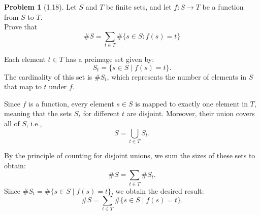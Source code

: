 \documentclass[12pt]{article}
\theoremstyle{definition}
\newtheorem{problem}{Problem}
\begin{document}
\begin{problem}[1.18]

    Let $S$ and $T$ be finite sets, and let $f: S \rightarrow T$ be a function from $S$ to $T$.\\
    Prove that
    \[
    \#S = \sum_{t \in T}\#\{s \in S : f(s) = t\}
    \]

    \begin{solution}
        Each element \( t \in T \) has a preimage set given by:
        \[
        S_t = \{ s \in S \mid f(s) = t \}.
        \]
        The cardinality of this set is \( \#S_t \), which represents the number of elements in \( S \) that map to \( t \) under \( f \).

        Since \( f \) is a function, every element \( s \in S \) is mapped to exactly one element in \( T \), meaning that the sets \( S_t \) for different \( t \) are disjoint. Moreover, their union covers all of \( S \), i.e.,
        \[
        S = \bigcup_{t \in T} S_t.
        \]

        By the principle of counting for disjoint unions, we sum the sizes of these sets to obtain:
        \[
        \#S = \sum_{t \in T} \#S_t.
        \]
        Since \( \#S_t = \#\{ s \in S \mid f(s) = t \} \), we obtain the desired result:
        \[
        \#S = \sum_{t \in T} \#\{ s \in S \mid f(s) = t \}.
        \]
    \end{solution}
\end{problem}
\end{document}
